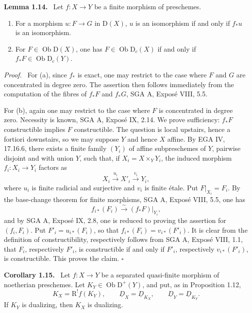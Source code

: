 \documentclass[12pt]{article}
\newcommand{\ob}{\operatorname{Ob}}
\newcommand{\D}{\mathrm D}
\newcommand{\R}{\mathrm R}
\newcommand{\qedtext}{\hfill$\square$}
\newenvironment{statement}[1]{\par\medskip\noindent\textbf{#1.}\ }{\par\medskip}
\newenvironment{prooftext}[1][Proof]{\par\noindent\emph{#1.}\ }{\par\medskip}
\begin{document}
\begin{statement}{Lemma 1.14}
Let $f:X\to Y$ be a finite morphism of preschemes.
\begin{enumerate}[label=\alph*)]
\item For a morphism $u:F\to G$ in $\D(X)$, $u$ is an isomorphism if and only if $f_*u$ is an isomorphism.
\item For $F\in\ob\D(X)$, one has $F\in\ob\D_c(X)$ if and only if $f_*F\in\ob\D_c(Y)$.
\end{enumerate}
\end{statement}

\begin{prooftext}
For (a), since $f_*$ is exact, one may restrict to the case where $F$ and $G$ are concentrated in degree zero. The assertion then follows immediately from the computation of the fibres of $f_*F$ and $f_*G$, SGA A, Exposé VIII, 5.5.

For (b), again one may restrict to the case where $F$ is concentrated in degree zero. Necessity is known, SGA A, Exposé IX, 2.14. We prove sufficiency: $f_*F$ constructible implies $F$ constructible. The question is local upstairs, hence a fortiori downstairs, so we may suppose $Y$ and hence $X$ affine. By EGA IV, 17.16.6, there exists a finite family $(Y_i)$ of affine subpreschemes of $Y$, pairwise disjoint and with union $Y$, such that, if $X_i=X\times_YY_i$, the induced morphism $f_i:X_i\to Y_i$ factors as
\[
   X_i\xrightarrow{u_i}X'_i\xrightarrow{v_i}Y_i,
\]
where $u_i$ is finite radicial and surjective and $v_i$ is finite étale. Put $F|_{X_i}=F_i$. By the base-change theorem for finite morphisms, SGA A, Exposé VIII, 5.5, one has
\[
   f_{i*}(F_i)\xrightarrow{\sim}(f_*F)|_{Y_i},
\]
and by SGA A, Exposé IX, 2.8, one is reduced to proving the assertion for $(f_i,F_i)$. Put $F'_i=u_{i*}(F_i)$, so that $f_{i*}(F_i)=v_{i*}(F'_i)$. It is clear from the definition of constructibility, respectively follows from SGA A, Exposé VIII, 1.1, that $F_i$, respectively $F'_i$, is constructible if and only if $F'_i$, respectively $v_{i*}(F'_i)$, is constructible. This proves the claim. \qedtext
\end{prooftext}

\begin{statement}{Corollary 1.15}
Let $f:X\to Y$ be a separated quasi-finite morphism of noetherian preschemes. Let $K_Y\in\ob\D^+(Y)$, and put, as in Proposition 1.12,
\[
   K_X=\R^!f(K_Y),\qquad \underline D_X=\underline D_{K_X},\qquad \underline D_Y=\underline D_{K_Y}.
\]
If $K_Y$ is dualizing, then $K_X$ is dualizing.
\end{statement}
\end{document}
